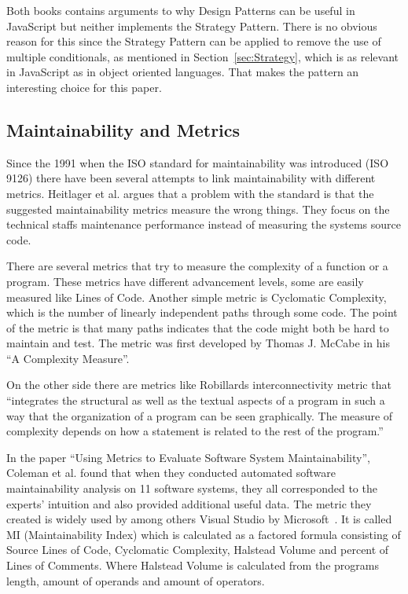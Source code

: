 \documentclass[conference, a4paper]{IEEEtran}
\begin{document}
Both books contains arguments to why Design Patterns can be useful in JavaScript but neither implements the Strategy Pattern. There is no obvious reason for this since the Strategy Pattern can be applied to remove the use of multiple conditionals, as mentioned in Section~\ref{sec:Strategy}, which is as relevant in JavaScript as in object oriented languages. That makes the pattern an interesting choice for this paper.

\subsection{Maintainability and Metrics}
\label{sec:Maintainability}

Since the 1991 when the ISO standard for maintainability was introduced (ISO 9126) there have been several attempts to link maintainability with different metrics. Heitlager et al. argues that a problem with the standard is that the suggested maintainability metrics measure the wrong things. They focus on the technical staffs maintenance performance instead of measuring the systems source code.~\cite{bibitem:Maintainability}

There are several metrics that try to measure the complexity of a function or a program. These metrics have different advancement levels, some are easily measured like Lines of Code. Another simple metric is Cyclomatic Complexity, which is the number of linearly independent paths through some code. The point of the metric is that many paths indicates that the code might both be hard to maintain and test. The metric was first developed by Thomas J. McCabe in his ``A Complexity Measure''.~\cite{bibitem:CC}

On the other side there are metrics like Robillards interconnectivity metric that ``integrates the structural as well as the textual aspects of a program in such a way that the organization of a program can be seen graphically. The measure of complexity depends on how a statement is related to the rest of the program.''~\cite{bibitem:Robillard}

In the paper ``Using Metrics to Evaluate Software System Maintainability'', Coleman et al. found that when they conducted automated software maintainability analysis on 11 software systems, they all corresponded to the experts' intuition and also provided additional useful data. The metric they created is widely used by among others Visual Studio by Microsoft~\cite{bibitem:MI}. It is called MI (Maintainability Index) which is calculated as a factored formula consisting of Source Lines of Code, Cyclomatic Complexity, Halstead Volume and percent of Lines of Comments. Where Halstead Volume is calculated from the programs length, amount of operands and amount of operators.~\cite{bibitem:MetricsToEvaluate}
\end{document}
